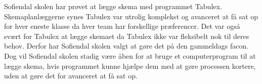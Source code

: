 Sofiendal skolen har prøvet at lægge skema med programmet Tabulex. Skemaplanlæggerne synes Tabulex var utrolig komplekst og avanceret at få sat op for hver eneste klasse da hver team har forskellige præferencer. Det var også svært for Tabulex at lægge skemaet da Tabulex ikke var fleksibelt nok til deres behov. Derfor har Sofiendal skolen valgt at gøre det på den gammeldags facon. Dog vil Sofiendal skolen stadig være åben for at bruge et computerprogram til at lægge skema, hvis programmet kunne hjælpe dem med at gøre processen kortere, uden at gøre det for avanceret at få sat op.

